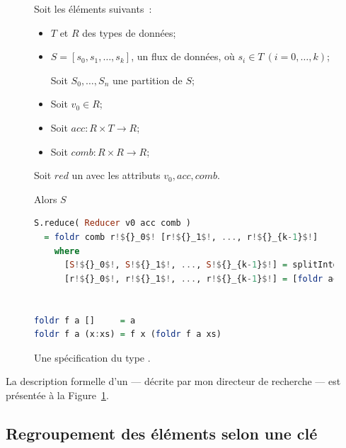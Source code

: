 \begin{figure}

\begin{framed}
Soit les \'el\'ements suivants~: 

\begin{itemize}

\item $T$ et $R$ des types de donn\'ees;

\item $S = [s_0, s_1, \ldots, s_k]$, un flux de donn\'ees, o\`u $s_i
\in T~(i=0, \ldots, k)$;

Soit $S_0, \ldots, S_n$ une partition de $S$;

\item Soit $v_0\in R$;

\item Soit $acc: R\times T \rightarrow R$;

\item Soit $comb: R\times R \rightarrow R$;


\end{itemize}

Soit $red$ un  avec les attributs $v_0, acc, comb$.

Alors $S$


\begin{lstlisting}[language=haskell,escapechar=\!]
S.reduce( Reducer v0 acc comb )
  = foldr comb r!${}_0$! [r!${}_1$!, ..., r!${}_{k-1}$!]
    where
      [S!${}_0$!, S!${}_1$!, ..., S!${}_{k-1}$!] = splitIntoSubstreams S k
      [r!${}_0$!, r!${}_1$!, ..., r!${}_{k-1}$!] = [foldr acc v0 S!${}_i$! | i <- [0, !$\ldots$!, k-1]]


foldr f a []     = a
foldr f a (x:xs) = f x (foldr f a xs)
\end{lstlisting}
\end{framed}

\caption{Une sp\'ecification du type .}
\label{reducer-spec.fig}
\end{figure}

La description formelle d'un  --- d\'ecrite par mon directeur de recherche --- est pr\'esent\'ee \`a la Figure~\ref{reducer-spec.fig}.



\subsection{Regroupement des \'el\'ements selon une cl\'e}

